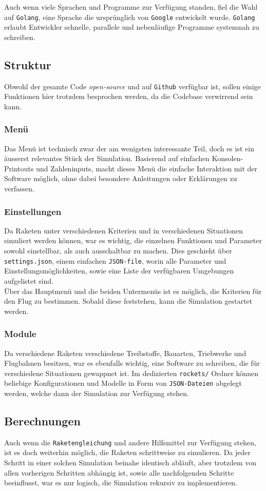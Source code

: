 \documentclass[11pt]{article}
\begin{document}
Auch wenn viele Sprachen und Programme zur Verfügung standen, fiel die Wahl auf
\texttt{Golang}, eine Sprache die ursprünglich von \texttt{Google} entwickelt wurde. \texttt{Golang}
erlaubt Entwickler schnelle, parallele und nebenläufige Programme systemnah zu
schreiben.
\subsection{Struktur}
\label{sec:orgc35e631}
Obwohl der gesamte Code \emph{open-source} und auf \texttt{Github} verfügbar ist, sollen einige
Funktionen hier trotzdem besprochen werden, da die Codebase verwirrend sein
kann.
\subsubsection{Menü}
\label{sec:org18d02c2}
Das Menü ist technisch zwar der am wenigsten interessante Teil, doch es ist ein
äusserst relevantes Stück der Simulation. Basierend auf einfachen
Konsolen-Printouts und Zahleninputs, macht dieses Menü die einfache Interaktion
mit der Software möglich, ohne dabei besondere Anleitungen oder Erklärungen zu
verfassen.
\subsubsection{Einstellungen}
\label{sec:orgd3cd208}
Da Raketen unter verschiedenen Kriterien und in verschiedenen Situationen
simuliert werden können, war es wichtig, die einzelnen Funktionen und Parameter
sowohl einstellbar, als auch ausschaltbar zu machen. Dies geschieht über
\texttt{settings.json}, einem einfachen \texttt{JSON-file}, worin alle Parameter und
Einstellungsmöglichkeiten, sowie eine Liste der verfügbaren Umgebungen
aufgelistet sind.\\
Über das Hauptmenü und die beiden Untermenüs ist es möglich, die Kriterien für
den Flug zu bestimmen. Sobald diese feststehen, kann die Simulation gestartet
werden.
\subsubsection{Module}
\label{sec:org216e70c}
Da verschiedene Raketen verschiedene Treibstoffe, Bauarten, Triebwerke und
Flugbahnen besitzen, war es ebenfalls wichtig, eine Software zu schreiben, die
für verschiedene Situationen gewappnet ist. Im dedizierten \texttt{rockets/} Ordner
können beliebige Konfigurationen und Modelle in Form von \texttt{JSON-Dateien} abgelegt
werden, welche dann der Simulation zur Verfügung stehen.
\subsection{Berechnungen}
\label{sec:org3fa98a3}
Auch wenn die \texttt{Raketengleichung} und andere Hilfsmittel zur Verfügung stehen, ist
es doch weiterhin möglich, die Raketen schrittweise zu simulieren. Da jeder
Schritt in einer solchen Simulation beinahe identisch abläuft, aber trotzdem von
allen vorherigen Schritten abhängig ist, sowie alle nachfolgenden Schritte
beeinflusst, war es nur logisch, die Simulation rekursiv zu implementieren. \\
\end{document}

